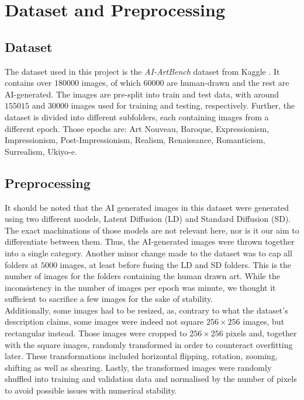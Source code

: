 \chapter{Dataset and Preprocessing}
\label{ch:dataset}

\section{Dataset}

The dataset used in this project is the \textit{AI-ArtBench} dataset from Kaggle \cite{aiartbench}.
It contains over $180000$ images, of which $60000$ are human-drawn and the rest are AI-generated.
The images are pre-split into train and test data, with around $155015$ and $30000$ images used for training and testing, respectively.
Further, the dataset is divided into different subfolders, each containing images from a different epoch.
Those epochs are: Art Nouveau, Baroque, Expressionism, Impressionism, Post-Impressionism, Realism, Renaissance, Romanticism, Surrealism, Ukiyo-e. \\

\section{Preprocessing}

It should be noted that the AI generated images in this dataset were generated using two different models, Latent Diffusion (LD) and Standard Diffusion (SD).
The exact machinations of those models are not relevant here, nor is it our aim to differentiate between them.
Thus, the AI-generated images were thrown together into a single category.
Another minor change made to the dataset was to cap all folders at $5000$ images, at least before fusing the LD and SD folders.
This is the number of images for the folders containing the human drawn art.
While the inconsistency in the number of images per epoch was minute, we thought it sufficient to sacrifice a few images for the sake of stability. \\

Additionally, some images had to be resized, as, contrary to what the dataset's description claims, some images were indeed not square $256 \times 256$ images,
but rectangular instead.
Those images were cropped to $256 \times 256$ pixels and, together with the square images, randomly transformed in order to counteract overfitting later.
These transformations included horizontal flipping, rotation, zooming, shifting as well as shearing. 
Lastly, the transformed images were randomly shuffled into training and validation data and normalised by the number of pixels to avoid possible issues with numerical stability.

